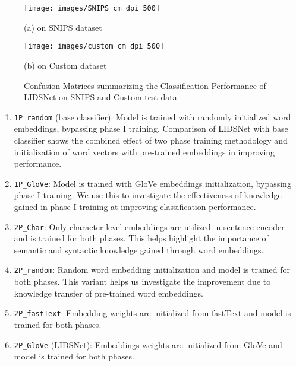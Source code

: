 \documentclass[conference]{IEEEtran}
\begin{document}
\begin{figure*}
	\centering
	\begin{minipage}[t]{0.4\textwidth}
		\texttt{[image: images/SNIPS\_cm\_dpi\_500]}
		\captionsetup{labelformat=empty}
		\caption*{(a) on SNIPS dataset}
		\label{fig:confusionMatrixSNIPSDataset}
	\end{minipage}
	\quad
	\begin{minipage}[t]{0.4\textwidth}
		\texttt{[image: images/custom\_cm\_dpi\_500]}
		\captionsetup{labelformat=empty}
		\caption*{(b) on Custom dataset}
		\label{fig:confusionMatrixCustomDataset}
	\end{minipage}
	\caption{Confusion Matrices summarizing the Classification Performance of LIDSNet on SNIPS and Custom test data}
	\label{fig:confusionMatrices}
\end{figure*}

\begin{enumerate}
	\item \verb|1P_random| (base classifier): Model is trained with randomly initialized word embeddings, bypassing phase I training. Comparison of LIDSNet with base classifier shows the combined effect of two phase training methodology and initialization of word vectors with pre-trained embeddings in improving performance.
	
	\item \verb|1P_GloVe|: Model is trained with GloVe embeddings initialization, bypassing phase I training. We use this to investigate the effectiveness of knowledge gained in phase I training at improving classification performance.
	
	\item \verb|2P_Char|: Only character-level embeddings are utilized in sentence encoder and is trained for both phases. This helps highlight the importance of semantic and syntactic knowledge gained through word embeddings.
	
	\item \verb|2P_random|: Random word embedding initialization and model is trained for both phases. This variant helps us investigate the improvement due to knowledge transfer of pre-trained word embeddings.
	
	\item \verb|2P_fastText|: Embedding weights are initialized from fastText \cite{bojanowski-etal-2017-enriching} and model is trained for both phases. 
	
	\item \verb|2P_GloVe| (LIDSNet): Embeddings weights are initialized from GloVe and model is trained for both phases.
\end{enumerate}
\end{document}
